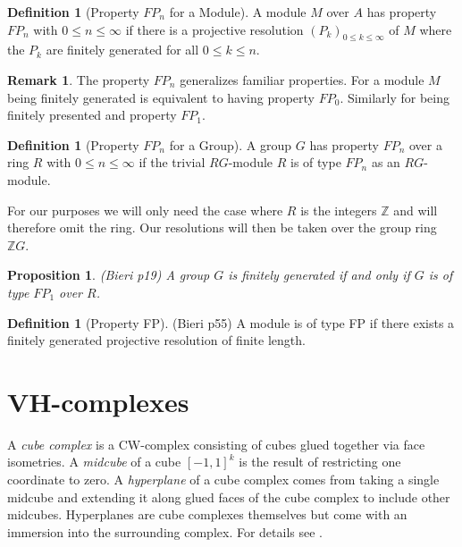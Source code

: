 \documentclass[12pt,parskip=full]{report}
\theoremstyle{plain}
\newtheorem{prop}[thm]{Proposition}
\theoremstyle{definition}
\newtheorem{rmk}[thm]{Remark}
\newtheorem{dfn}[thm]{Definition}
\begin{document}
\begin{dfn}
[Property \(FP_n\) for a Module]

A module \(M\) over \(A\) has property \(FP_n\) with \(0\leq n\leq \infty\) if there is a projective resolution \((P_k)_{0\leq k\leq \infty}\) of \(M\) where the \(P_k\) are finitely generated for all \(0\leq k\leq n\).
\end{dfn}

\begin{rmk}
The property \(FP_n\) generalizes familiar properties. For a module \(M\) being finitely generated is equivalent to having property \(FP_0\). Similarly for being finitely presented and property \(FP_1\).
\end{rmk}

\begin{dfn}
[Property \(FP_n\) for a Group]

A group \(G\) has property \(FP_n\) over a ring \(R\) with \(0\leq n\leq \infty\) if the trivial \(RG\)-module \(R\) is of type \(FP_n\) as an \(RG\)-module.
\end{dfn}

For our purposes we will only need the case where \(R\) is the integers \(\mathbb{Z}\) and will therefore omit the ring. Our resolutions will then be taken over the group ring \(\mathbb{Z}G\).

\begin{prop}
(Bieri p19)
A group \(G\) is finitely generated if and only if \(G\) is of type \(FP_1\) over \(R\).
\end{prop}

\begin{dfn}
[Property FP]
(Bieri p55)
A module is of type FP if there exists a finitely generated projective resolution of finite length.
\end{dfn}

\section{VH-complexes}

A \emph{cube complex} is a CW-complex consisting of cubes glued together via face isometries. A \emph{midcube} of a cube \([-1,1]^k\) is the result of restricting one coordinate to zero. A \emph{hyperplane} of a cube complex comes from taking a single midcube and extending it along glued faces of the cube complex to include other midcubes. Hyperplanes are cube complexes themselves but come with an immersion into the surrounding complex. For details see \cite{haglundwise}.
\end{document}
